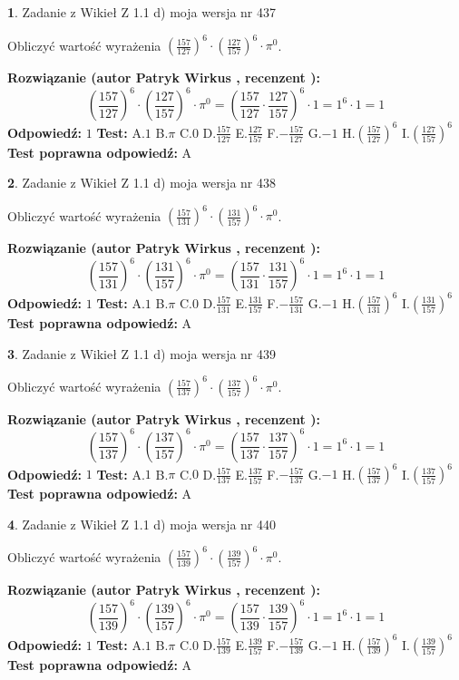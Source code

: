 \documentclass[12pt, a4paper]{article}
\theoremstyle{definition} %
\newtheorem{zad}{}
\newcommand{\zadStart}[1]{\begin{zad}#1\newline}
\newcommand{\zadStop}{\end{zad}}
\newcommand{\rozwStart}[2]{\noindent \textbf{Rozwiązanie (autor #1 , recenzent #2): }\newline}
\newcommand{\rozwStop}{\newline}
\newcommand{\odpStart}{\noindent \textbf{Odpowiedź:}\newline}
\newcommand{\odpStop}{\newline}
\newcommand{\testStart}{\noindent \textbf{Test:}\newline}
\newcommand{\testStop}{\newline}
\newcommand{\kluczStart}{\noindent \textbf{Test poprawna odpowiedź:}\newline}
\newcommand{\kluczStop}{\newline}
\begin{document}
\zadStart{Zadanie z Wikieł Z 1.1 d) moja wersja nr 437}

Obliczyć wartość wyrażenia $(\frac{157}{127})^{6} \cdot (\frac{127}{157})^{6} \cdot \pi^{0}$.
\zadStop
\rozwStart{Patryk Wirkus}{}
$$(\frac{157}{127})^{6} \cdot (\frac{127}{157})^{6} \cdot \pi^{0} = (\frac{157}{127} \cdot \frac{127}{157})^{6} \cdot 1 = 1^{6} \cdot 1 = 1$$
\rozwStop
\odpStart
$1$
\odpStop
\testStart
A.$1$ B.$\pi$ C.$0$ D.$\frac{157}{127}$ E.$\frac{127}{157}$
F.$-\frac{157}{127}$ G.$-1$
H.$(\frac{157}{127})^{6}$
I.$(\frac{127}{157})^{6}$
\testStop
\kluczStart
A
\kluczStop



\zadStart{Zadanie z Wikieł Z 1.1 d) moja wersja nr 438}

Obliczyć wartość wyrażenia $(\frac{157}{131})^{6} \cdot (\frac{131}{157})^{6} \cdot \pi^{0}$.
\zadStop
\rozwStart{Patryk Wirkus}{}
$$(\frac{157}{131})^{6} \cdot (\frac{131}{157})^{6} \cdot \pi^{0} = (\frac{157}{131} \cdot \frac{131}{157})^{6} \cdot 1 = 1^{6} \cdot 1 = 1$$
\rozwStop
\odpStart
$1$
\odpStop
\testStart
A.$1$ B.$\pi$ C.$0$ D.$\frac{157}{131}$ E.$\frac{131}{157}$
F.$-\frac{157}{131}$ G.$-1$
H.$(\frac{157}{131})^{6}$
I.$(\frac{131}{157})^{6}$
\testStop
\kluczStart
A
\kluczStop



\zadStart{Zadanie z Wikieł Z 1.1 d) moja wersja nr 439}

Obliczyć wartość wyrażenia $(\frac{157}{137})^{6} \cdot (\frac{137}{157})^{6} \cdot \pi^{0}$.
\zadStop
\rozwStart{Patryk Wirkus}{}
$$(\frac{157}{137})^{6} \cdot (\frac{137}{157})^{6} \cdot \pi^{0} = (\frac{157}{137} \cdot \frac{137}{157})^{6} \cdot 1 = 1^{6} \cdot 1 = 1$$
\rozwStop
\odpStart
$1$
\odpStop
\testStart
A.$1$ B.$\pi$ C.$0$ D.$\frac{157}{137}$ E.$\frac{137}{157}$
F.$-\frac{157}{137}$ G.$-1$
H.$(\frac{157}{137})^{6}$
I.$(\frac{137}{157})^{6}$
\testStop
\kluczStart
A
\kluczStop



\zadStart{Zadanie z Wikieł Z 1.1 d) moja wersja nr 440}

Obliczyć wartość wyrażenia $(\frac{157}{139})^{6} \cdot (\frac{139}{157})^{6} \cdot \pi^{0}$.
\zadStop
\rozwStart{Patryk Wirkus}{}
$$(\frac{157}{139})^{6} \cdot (\frac{139}{157})^{6} \cdot \pi^{0} = (\frac{157}{139} \cdot \frac{139}{157})^{6} \cdot 1 = 1^{6} \cdot 1 = 1$$
\rozwStop
\odpStart
$1$
\odpStop
\testStart
A.$1$ B.$\pi$ C.$0$ D.$\frac{157}{139}$ E.$\frac{139}{157}$
F.$-\frac{157}{139}$ G.$-1$
H.$(\frac{157}{139})^{6}$
I.$(\frac{139}{157})^{6}$
\testStop
\kluczStart
A
\kluczStop
\end{document}
